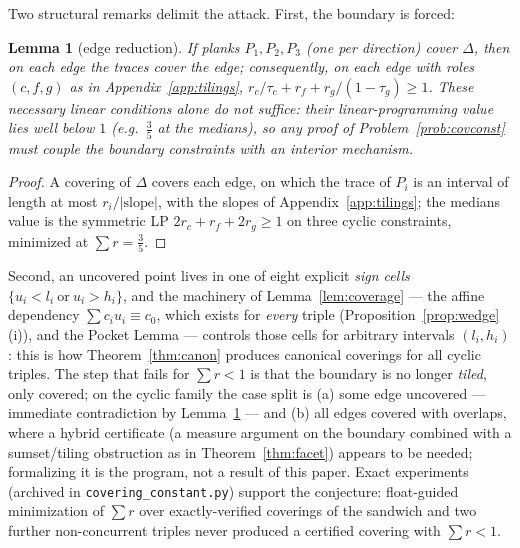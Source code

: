 \documentclass[11pt,reqno]{amsart}
\theoremstyle{plain}
\newtheorem{lemma}[theorem]{Lemma}
\theoremstyle{definition}
\theoremstyle{remark}
\begin{document}
Two structural remarks delimit the attack. First, the boundary is forced:

\begin{lemma}[edge reduction]\label{lem:edgered}
If planks $P_1,P_2,P_3$ (one per direction) cover $\Delta$, then on each edge
the traces cover the edge; consequently, on each edge with roles $(c,f,g)$ as
in Appendix~\ref{app:tilings},
$r_c/\tau_c+r_f+r_g/(1-\tau_g)\ge1$. These necessary linear conditions alone
do \emph{not} suffice: their linear-programming value lies well below $1$
(e.g.\ $\tfrac35$ at the medians), so any proof of
Problem~\ref{prob:covconst} must couple the boundary constraints with an
interior mechanism.
\end{lemma}

\begin{proof}
A covering of $\Delta$ covers each edge, on which the trace of $P_i$ is an
interval of length at most $r_i/|\text{slope}|$, with the slopes of
Appendix~\ref{app:tilings}; the medians value is the symmetric LP
$2r_c+r_f+2r_g\ge1$ on three cyclic constraints, minimized at
$\sum r=\tfrac35$.
\end{proof}

Second, an uncovered point lives in one of eight explicit \emph{sign cells}
$\{u_i<l_i\ \text{or}\ u_i>h_i\}$, and the machinery of
Lemma~\ref{lem:coverage} --- the affine dependency $\sum c_iu_i\equiv c_0$,
which exists for \emph{every} triple (Proposition~\ref{prop:wedge}(i)), and
the Pocket Lemma --- controls those cells for arbitrary intervals
$(l_i,h_i)$: this is how Theorem~\ref{thm:canon} produces canonical coverings
for all cyclic triples. The step that fails for $\sum r<1$ is that the
boundary is no longer \emph{tiled}, only covered; on the cyclic family the
case split is (a) some edge uncovered --- immediate contradiction by
Lemma~\ref{lem:edgered} --- and (b) all edges covered with overlaps, where a
hybrid certificate (a measure argument on the boundary combined with a
sumset/tiling obstruction as in Theorem~\ref{thm:facet}) appears to be
needed; formalizing it is the program, not a result of this paper.
Exact experiments (archived in \texttt{covering\_constant.py}) support the
conjecture: float-guided minimization of $\sum r$ over exactly-verified
coverings of the sandwich and two further non-concurrent triples never
produced a certified covering with $\sum r<1$.
\end{document}
